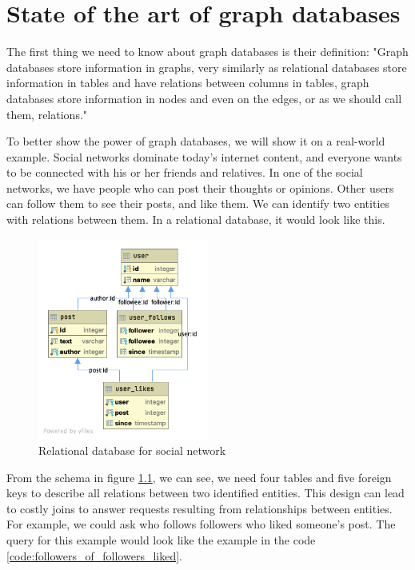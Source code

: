 \chapter {State of the art of graph databases}

The first thing we need to know about graph databases is their definition:
"Graph databases store information in graphs, very similarly as relational databases store information in tables and have relations between columns in tables, graph databases store information in nodes and even on the edges, or as we should call them, relations." \cite{morgante_what_2021}

To better show the power of graph databases, we will show it on a real-world example.
Social networks dominate today's internet content, and everyone wants to be connected with his or her friends and relatives.
In one of the social networks, we have people who can post their thoughts or opinions.
Other users can follow them to see their posts, and like them.
We can identify two entities with relations between them.
In a relational database, it would look like this.

\begin{figure}[H]
    \centering
    \includegraphics[width=0.5\textwidth]{content/thesis-db.png}
    \caption{Relational database for social network}
    \label{fig:relscheme}
\end{figure}

From the schema in figure \ref{fig:relscheme}, we can see, we need four tables and five foreign keys to describe all relations between two identified entities.
This design can lead to costly joins to answer requests resulting from relationships between entities.
For example, we could ask who follows followers who liked someone's post. The query for this example would look like the example in the code \ref{code:followers_of_followers_liked}.

